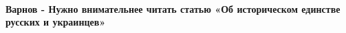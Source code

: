  
 
 
 
 
\paragraph{Варнов - Нужно внимательнее читать статью «Об историческом единстве русских и украинцев»}
\label{sec:14_07_2021.fb.krjukova_svetlana.1.statja_putina_mnenie.cmt.varnov_vnimatelnost_statja}

